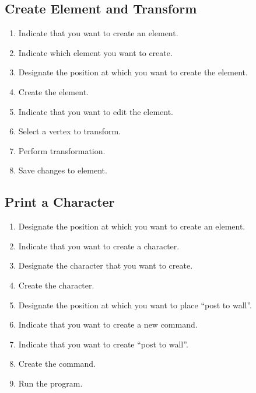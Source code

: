\subsection{Create Element and Transform}
\label{app:euc_create_transform}

\begin{enumerate}
  \item Indicate that you want to create an element.
  \item Indicate which element you want to create.
  \item Designate the position at which you want to create the element.
  \item Create the element.
  \item Indicate that you want to edit the element.
  \item Select a vertex to transform.
  \item Perform transformation.
  \item Save changes to element.
\end{enumerate}

\subsection{Print a Character}
\label{app:euc_print_character}

\begin{enumerate}
  \item Designate the position at which you want to create an element.
  \item Indicate that you want to create a character.
  \item Designate the character that you want to create.
  \item Create the character.
  \item Designate the position at which you want to place ``post to wall''.
  \item Indicate that you want to create a new command.
  \item Indicate that you want to create ``post to wall''.
  \item Create the command.
  \item Run the program.
\end{enumerate}
